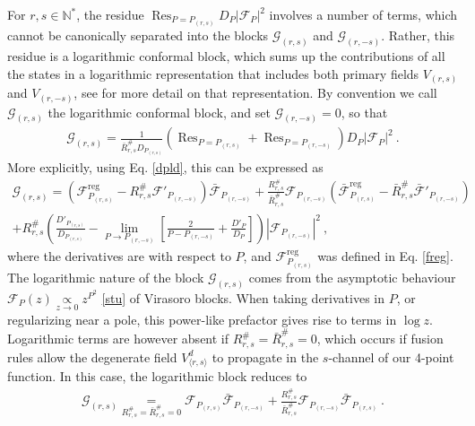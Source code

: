 \documentclass[12pt, a4paper]{article}
\begin{document}
For $r,s\in\mathbb{N}^*$, the residue $\operatorname{Res}_{P=P_{(r,s)}}D_P\left|\mathcal{F}_{P}\right|^2$ 
involves a number of terms, which cannot be canonically separated into the blocks 
$\mathcal{G}_{(r,s)}$ and $\mathcal{G}_{(r,-s)}$. Rather, this residue is a logarithmic conformal block, which sums up the contributions of all the states in a logarithmic representation that includes both primary fields $V_{(r,s)}$ and $V_{(r,-s)}$, see \cite{nr20} for more detail on that representation. By convention we call $\mathcal{G}_{(r,s)}$ the logarithmic conformal block, and set $\mathcal{G}_{(r,-s)}=0$, so that
\begin{align}
 \mathcal{G}_{(r,s)} = \frac{1}{\bar R^{\#}_{r,s} D_{P_{(r,s)}}} \left( \operatorname{Res}_{P=P_{(r,s)}} + \operatorname{Res}_{P=P_{(r,-s)}}\right)D_P\left|\mathcal{F}_{P}\right|^2 \ . 
\end{align}
More explicitly, using Eq. \eqref{dpld}, this can be expressed as 
\begin{multline}
  \mathcal{G}_{(r,s)} = \left(\mathcal{F}^\text{reg}_{P_{(r,s)}} -R^{\#}_{r,s} \mathcal{F}'_{P_{(r,-s)}}\right) \bar{\mathcal{F}}_{P_{(r,-s)}} 
  + \frac{R^{\#}_{r,s}}{\bar{R}^{\#}_{r,s}} \mathcal{F}_{P_{(r,-s)}} \left(\bar{\mathcal{F}}^\text{reg}_{P_{(r,s)}} -\bar R^{\#}_{r,s} \bar{\mathcal{F}}'_{P_{(r,-s)}}\right)
  \\
  + R^{\#}_{r,s} \left( \frac{D'_{P_{(r,s)}}}{D_{P_{(r,s)}}} - \lim_{P\to P_{(r,-s)}}\left[\frac{2}{P-P_{(r,-s)}} +\frac{D'_P}{D_P}\right]\right)
  \left|\mathcal{F}_{P_{(r,-s)}}\right|^2 
  \ ,
\end{multline}
where the derivatives are with respect to $P$, and
$\mathcal{F}^\text{reg}_{P_{(r,s)}}$ was defined in Eq. \eqref{freg}.
The logarithmic nature of the block $\mathcal{G}_{(r,s)}$ comes from the asymptotic behaviour $\mathcal{F}_P(z)\underset{z\to 0}{\propto} z^{P^2} $ \eqref{stu} of Virasoro blocks. When taking derivatives in $P$, or regularizing near a pole, this power-like prefactor gives rise to terms in $\log z$. Logarithmic terms are however absent if $R^{\#}_{r,s}=\bar R^{\#}_{r,s}=0$, which occurs if fusion rules allow the degenerate field $V^d_{\langle r,s\rangle}$ to propagate in the $s$-channel of our 4-point function. In this case, the logarithmic block reduces to 
\begin{align}
 \mathcal{G}_{(r,s)} \underset{R^{\#}_{r,s}=\bar R^{\#}_{r,s}=0}{=} 
 \mathcal{F}_{P_{(r,s)}}  \bar{\mathcal{F}}_{P_{(r,-s)}} + 
 \frac{R^{\#}_{r,s}}{\bar{R}^{\#}_{r,s}} \mathcal{F}_{P_{(r,-s)}} \bar{\mathcal{F}}_{P_{(r,s)}} \ .
\end{align}
\end{document}
